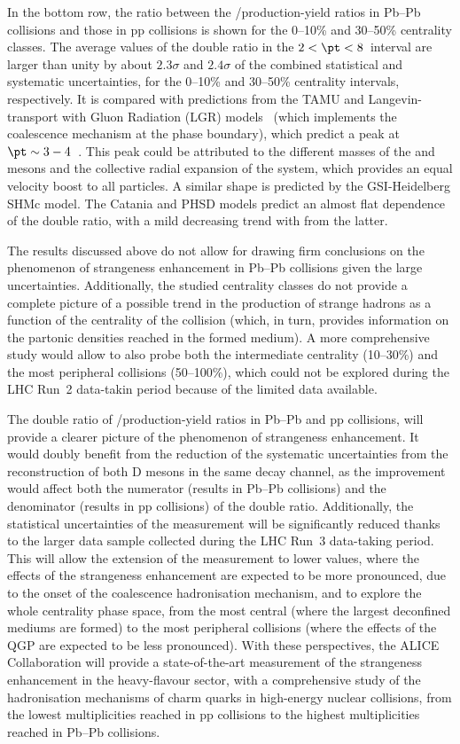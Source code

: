 In the bottom row, the ratio between the \ds/\dz production-yield ratios in Pb--Pb collisions and those in pp collisions is shown for the 0--10\% and 30--50\% centrality classes. The average values of the double ratio in the $2 < \pt < 8$~\gevc interval are larger than unity by about $2.3\sigma$ and $2.4\sigma$ of the combined statistical and systematic uncertainties, for the 0--10\% and 30--50\% centrality intervals, respectively. It is compared with predictions from the TAMU and Langevin-transport with Gluon Radiation (LGR) models~\cite{Li:2019lex} (which implements the coalescence mechanism at the phase boundary), which predict a peak at $\pt\sim3-4$~\gevc. This peak could be attributed to the different masses of the \ds and \dz mesons and the collective radial expansion of the system, which provides an equal velocity boost to all particles. A similar \pt shape is predicted by the GSI-Heidelberg SHMc model. The Catania and PHSD models predict an almost flat \pt dependence of the double ratio, with a mild decreasing trend with \pt from the latter. 


The results discussed above do not allow for drawing firm conclusions on the phenomenon of strangeness enhancement in Pb--Pb collisions given the large uncertainties. Additionally, the studied centrality classes do not provide a complete picture of a possible trend in the production of strange hadrons as a function of the centrality of the collision (which, in turn, provides information on the partonic densities reached in the formed medium). A more comprehensive study would allow to also probe both the intermediate centrality (10--30\%) and the most peripheral collisions (50--100\%), which could not be explored during the LHC Run~2 data-takin period because of the limited data available.

The double ratio of \ds/\dpl production-yield ratios in Pb--Pb and pp collisions, will provide a clearer picture of the phenomenon of strangeness enhancement. It would doubly benefit from the reduction of the systematic uncertainties from the reconstruction of both D mesons in the same decay channel, as the improvement would affect both the numerator (results in Pb--Pb collisions) and the denominator (results in pp collisions) of the double ratio. Additionally, the statistical uncertainties of the measurement will be significantly reduced thanks to the larger data sample collected during the LHC Run~3 data-taking period. This will allow the extension of the measurement to lower \pt values, where the effects of the strangeness enhancement are expected to be more pronounced, due to the onset of the coalescence hadronisation mechanism, and to explore the whole centrality phase space, from the most central (where the largest deconfined mediums are formed) to the most peripheral collisions (where the effects of the QGP are expected to be less pronounced). With these perspectives, the ALICE Collaboration will provide a state-of-the-art measurement of the strangeness enhancement in the heavy-flavour sector, with a comprehensive study of the hadronisation mechanisms of charm quarks in high-energy nuclear collisions, from the lowest multiplicities reached in pp collisions to the highest multiplicities reached in Pb--Pb collisions.

